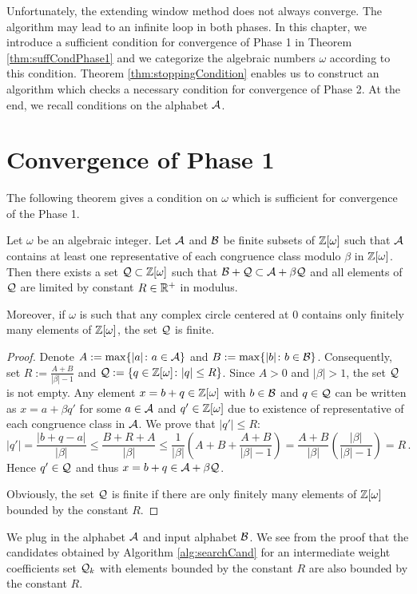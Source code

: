 Unfortunately, the extending window method does not always converge. The algorithm may lead to an infinite loop in both phases. 
In this chapter, we introduce a sufficient condition for convergence of Phase 1 in Theorem \ref{thm:suffCondPhase1} and we categorize the algebraic numbers $\omega$ according to this condition. Theorem \ref{thm:stoppingCondition} enables us to construct an algorithm which checks a necessary condition for convergence of Phase 2. At the end, we recall conditions on the alphabet $\mathcal{A}$. 


\section{Convergence of Phase 1}
\label{sec:convergencePhase1}
The following theorem gives a condition on $\omega$ which is sufficient for convergence of the Phase 1.
\begin{theo}
\label{thm:suffCondPhase1}
    Let $\omega$ be an algebraic integer. Let $\mathcal{A}$ and $\mathcal{B}$ be finite subsets of $\mathbb{Z}[\omega]$ such that $\mathcal{A}$ contains at least one representative of each congruence class modulo $\beta$ in $\mathbb{Z}[\omega]$. Then there exists a set $\mathcal{Q}\subset\mathbb{Z}[\omega]$ such that $ \mathcal{B} + \mathcal{Q} \subset \mathcal{A} + \beta \mathcal{Q}$ and all elements of $\mathcal{Q}$ are limited by constant $R\in \mathbb{R}^+$ in modulus.
    
    Moreover, if $\omega$ is such that any complex circle centered at 0 contains only finitely  many elements of $\mathbb{Z}[\omega]$, the set $\mathcal{Q}$ is finite. 
\end{theo}
\begin{proof}
 Denote $A:=\max\{|a|\colon a \in \mathcal{A}\}$ and $B:=\max\{|b|\colon b\in\mathcal{B}\}$. Consequently, set $R:=\frac{A+B}{|\beta|-1}$ and $\mathcal{Q}:=\{q\in\mathbb{Z}[\omega]\colon |q|\leq R\}$. Since $A>0$ and $|\beta|>1$, the set $\mathcal{Q}$ is not empty. Any element $x=b+q \in \mathbb{Z}[\omega]$ with $b\in\mathcal{B}$ and $q\in\mathcal{Q}$ can be written as $x=a+\beta q'$ for some $a\in\mathcal{A}$  and $q'\in\mathbb{Z}[\omega]$ due to existence of representative of each congruence class in $\mathcal{A}$. We prove that $|q'|\leq R$:
 $$
    |q'|=\frac{|b+q-a|}{|\beta|}\leq \frac{B+R+A}{|\beta|} \leq \frac{1}{|\beta|}\left(A+B+\frac{A+B}{|\beta|-1}\right)  =\frac{A+B}{|\beta|}\left(\frac{|\beta|}{|\beta|-1}\right)=R\,.
 $$ 
 Hence $q'\in\mathcal{Q}$ and thus  $x=b+q \in \mathcal{A} + \beta \mathcal{Q}$. 
 
 Obviously, the set $\mathcal{Q}$ is finite if there are only finitely many elements of $\mathbb{Z}[\omega]$ bounded by the constant $R$.
\end{proof}
We plug in the alphabet $\mathcal{A}$ and input alphabet $\mathcal{B}$. We see from the proof that the candidates obtained by Algorithm \ref{alg:searchCand} for an intermediate weight coefficients set $\mathcal{Q}_k$ with elements bounded by the constant $R$ are also bounded by the constant $R$. 

